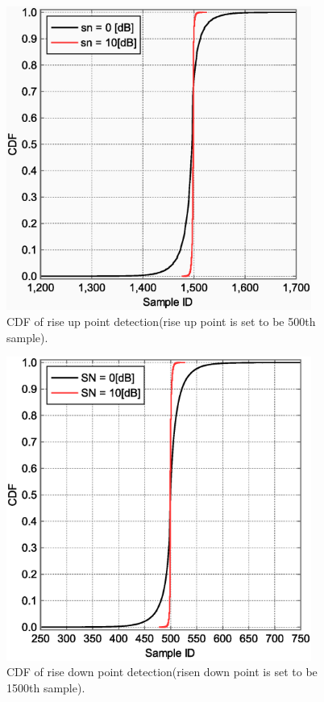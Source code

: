 \begin{figure}[!htp]
\centering
\includegraphics[width=100mm]{cdf_OFF2ON.eps}
\caption{CDF of rise up point detection(rise up point is set to be 500th sample).}
\label{cdf_off2on}
\end{figure}


\begin{figure}[!htp]
\centering
\includegraphics[width=100mm]{cdf_ON2OFF.eps}
\caption{CDF of rise down point detection(risen down point is set to be 1500th sample).}
\label{cdf_on2off}
\end{figure}

